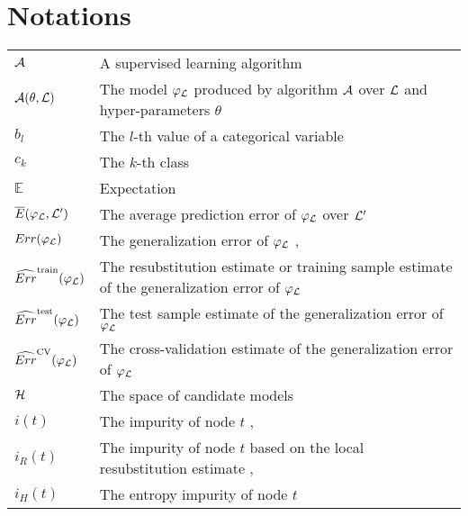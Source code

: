 
\chapter{Notations}

\begin{tabularx}{\textwidth}{ l X }
${\cal A}$ & A supervised learning algorithm \dotfill  \pageref{ntn:A}\\
${\cal A}(\theta, {\cal L})$ & The model $\varphi_{\cal L}$ produced by algorithm ${\cal A}$ over ${\cal L}$ and hyper-parameters $\theta$ \dotfill  \pageref{ntn:A-func}\\
$b_l$ & The $l$-th value of a categorical variable \dotfill  \pageref{ntn:b_l}\\
$c_k$ & The $k$-th class \dotfill  \pageref{ntn:c_k}\\
$\mathbb{E}$ & Expectation \dotfill \\
$\overline{E}(\varphi_{\cal L}, {\cal L}^\prime)$ & The average prediction error of $\varphi_{\cal L}$ over ${\cal L}^\prime$ \dotfill  \pageref{ntn:E_bar}\\
$Err(\varphi_{\cal L})$ & The generalization error of $\varphi_{\cal L}$ \dotfill  \pageref{eqn:generalization-error}, \pageref{eqn:4:generalization-error}\\
$\widehat{Err}^\text{train}(\varphi_{\cal L})$ & The resubstitution estimate or training sample estimate of the generalization error of $\varphi_{\cal L}$ \dotfill  \pageref{eqn:training-error}\\
$\widehat{Err}^\text{test}(\varphi_{\cal L})$ & The test sample estimate of the generalization error of $\varphi_{\cal L}$ \dotfill  \pageref{eqn:test-error}\\
$\widehat{Err}^\text{CV}(\varphi_{\cal L})$ & The cross-validation  estimate of the generalization error of $\varphi_{\cal L}$ \dotfill  \pageref{eqn:cv-error}\\
${\cal H}$ & The space of candidate models \dotfill  \pageref{ntn:H}\\
$i(t)$ & The impurity of node $t$ \dotfill  \pageref{ntn:i_t}, \pageref{ntn:i_t2}\\
$i_R(t)$ & The impurity of node $t$ based on the local resubstitution estimate \dotfill \pageref{eqn:impurity:error},~\pageref{eqn:impurity:variance}\\
$i_H(t)$ & The entropy impurity of node $t$ \dotfill  \pageref{eqn:impurity:shannon}\\

\end{tabularx}
